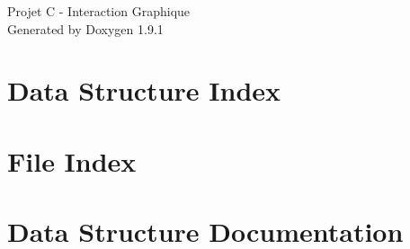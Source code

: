\let\mypdfximage\pdfximage\def\pdfximage{\immediate\mypdfximage}\documentclass[twoside]{book}
\newcommand{\+}{\discretionary{\mbox{\scriptsize$\hookleftarrow$}}{}{}}
\newcommand{\clearemptydoublepage}{%
  \newpage{\pagestyle{empty}\cleardoublepage}%
}
\begin{document}
\raggedbottom

\hypersetup{pageanchor=false,
             bookmarksnumbered=true,
             pdfencoding=unicode
            }
\begin{titlepage}
\vspace*{7cm}
\begin{center}%
{\Large Projet C -\/ Interaction Graphique }\\
\vspace*{1cm}
{\large Generated by Doxygen 1.9.1}\\
\end{center}
\end{titlepage}
\clearemptydoublepage
{}
\tableofcontents
\clearemptydoublepage
{}
\hypersetup{pageanchor=true}

\chapter{Data Structure Index}

\chapter{File Index}

\chapter{Data Structure Documentation}




















\end{document}
